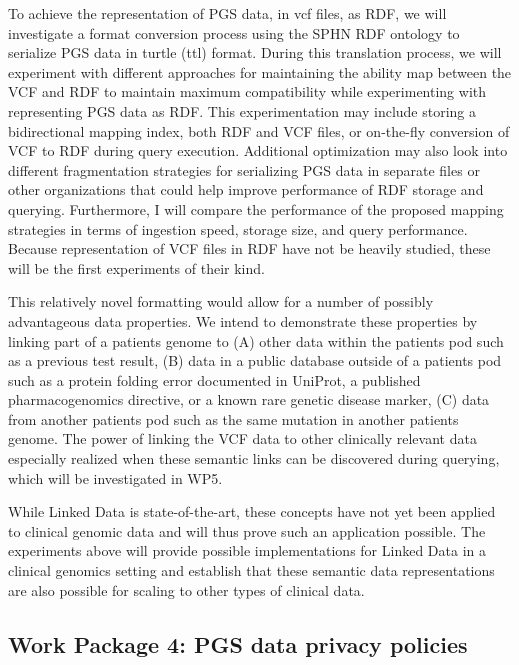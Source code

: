\documentclass[runningheads]{llncs}
\begin{document}
To achieve the representation of PGS data, in vcf files, as RDF, we will investigate a format conversion process using the SPHN RDF ontology \cite{van_der_horst_bridging_2023} to serialize PGS data in turtle (ttl) format. 
During this translation process, we will experiment with different approaches for maintaining the ability map between the VCF and RDF to maintain maximum compatibility while experimenting with representing PGS data as RDF. 
This experimentation may include storing a bidirectional mapping index, both RDF and VCF files, or on-the-fly conversion of VCF to RDF during query execution. 
Additional optimization may also look into different fragmentation strategies for serializing PGS data in separate files or other organizations that could help improve performance of RDF storage and querying.
Furthermore, I will compare the performance of the proposed mapping strategies in terms of ingestion speed, storage size, and query performance. 
Because representation of VCF files in RDF have not be heavily studied, these will be the first experiments of their kind.

This relatively novel formatting would allow for a number of possibly advantageous data properties. 
We intend to demonstrate these properties by linking part of a patient\textquotesingle s genome to
(A) other data within the patient\textquotesingle s pod such as a previous test result, 
(B) data in a public database outside of a patient\textquotesingle s pod such as a protein folding error documented in UniProt, a published pharmacogenomics directive, or a known rare genetic disease marker,
(C) data from another patient\textquotesingle s pod such as the same mutation in another patient\textquotesingle s genome.
The power of linking the VCF data to other clinically relevant data especially realized when these semantic links can be discovered during querying, which will be investigated in WP5. 

While Linked Data is state-of-the-art, these concepts have not yet been applied to clinical genomic data and will thus prove such an application possible. 
The experiments above will provide possible implementations for Linked Data in a clinical genomics setting and establish that these semantic data representations are also possible for scaling to other types of clinical data.


\subsection{Work Package 4: PGS data privacy policies}
\end{document}
